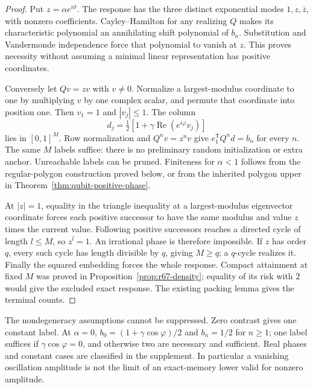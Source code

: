 \begin{proof}
Put $z=\alpha e^{i\vartheta}$. The response has the three distinct exponential modes $1,z,\bar z$, with nonzero coefficients. Cayley--Hamilton for any realizing $Q$ makes its characteristic polynomial an annihilating shift polynomial of $b_n$. Substitution and Vandermonde independence force that polynomial to vanish at $z$. This proves necessity without assuming a minimal linear representation has positive coordinates.

Conversely let $Qv=zv$ with $v\ne0$. Normalize a largest-modulus coordinate to one by multiplying $v$ by one complex scalar, and permute that coordinate into position one. Then $v_1=1$ and $|v_j|\le1$. The column
\[
 d_j=\tfrac12[1+\gamma\operatorname{Re}(e^{i\varphi}v_j)]
\]
lies in $[0,1]^M$. Row normalization and $Q^nv=z^nv$ give $e_1^{\mathsf T}Q^nd=b_n$ for every $n$. The same $M$ labels suffice: there is no preliminary random initialization or extra anchor. Unreachable labels can be pruned. Finiteness for $\alpha<1$ follows from the regular-polygon construction proved below, or from the inherited polygon upper in Theorem~\ref{thm:qubit-positive-phase}.

At $|z|=1$, equality in the triangle inequality at a largest-modulus eigenvector coordinate forces each positive successor to have the same modulus and value $z$ times the current value. Following positive successors reaches a directed cycle of length $l\le M$, so $z^l=1$. An irrational phase is therefore impossible. If $z$ has order $q$, every such cycle has length divisible by $q$, giving $M\ge q$; a $q$-cycle realizes it. Finally the squared embedding forces the whole response. Compact attainment at fixed $M$ was proved in Proposition~\ref{prop:r67-density}; equality of its risk with $2$ would give the excluded exact response. The existing packing lemma gives the terminal counts.
\end{proof}

The nondegeneracy assumptions cannot be suppressed. Zero contrast gives one constant label. At $\alpha=0$, $b_0=(1+\gamma\cos\varphi)/2$ and $b_n=1/2$ for $n\ge1$; one label suffices if $\gamma\cos\varphi=0$, and otherwise two are necessary and sufficient. Real phases and constant cases are classified in the supplement. In particular a vanishing oscillation amplitude is not the limit of an exact-memory lower valid for nonzero amplitude.

